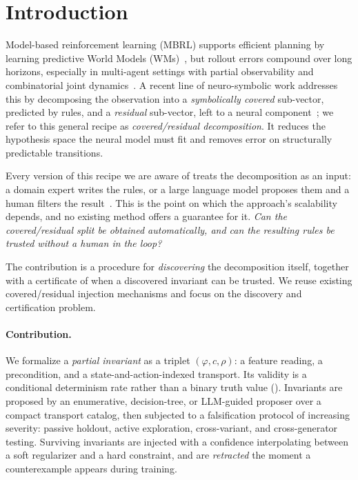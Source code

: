 \documentclass[letterpaper]{article} %
\let\autoref\Cref
\theoremstyle{plain}
\theoremstyle{definition}
\theoremstyle{remark}
\begin{document}
\section{Introduction}
\label{sec:intro}

Model-based reinforcement learning (MBRL) supports efficient planning by learning predictive World Models (WMs)~\cite{hafner2018planet,hafner2019dreamer,janner2019mbpo,schrittwieser2020muzero}, but rollout errors compound over long horizons, especially in multi-agent settings with partial observability and combinatorial joint dynamics~\cite{willemsen2021mambpo}. A recent line of neuro-symbolic work addresses this by decomposing the observation into a \emph{symbolically covered} sub-vector, predicted by rules, and a \emph{residual} sub-vector, left to a neural component~\cite{balloch2023neurosymbolicworldmodelsadapting,zhu2022iaem}; we refer to this general recipe as \emph{covered/residual decomposition}. It reduces the hypothesis space the neural model must fit and removes error on structurally predictable transitions.

Every version of this recipe we are aware of treats the decomposition as an input: a domain expert writes the rules, or a large language model proposes them and a human filters the result~\cite{zhou2024walle,athalye2026pixelstopredicates}. This is the point on which the approach's scalability depends, and no existing method offers a guarantee for it. \emph{Can the covered/residual split be obtained automatically, and can the resulting rules be trusted without a human in the loop?}

The contribution is a procedure for \emph{discovering} the decomposition itself, together with a certificate of when a discovered invariant can be trusted. We reuse existing covered/residual injection mechanisms and focus on the discovery and certification problem.

\paragraph{Contribution.} We formalize a \emph{partial invariant} as a triplet $(\varphi, c, \rho)$: a feature reading, a precondition, and a state-and-action-indexed transport. Its validity is a conditional determinism rate rather than a binary truth value (\autoref{sec:invariants}). Invariants are proposed by an enumerative, decision-tree, or LLM-guided proposer over a compact transport catalog, then subjected to a falsification protocol of increasing severity: passive holdout, active exploration, cross-variant, and cross-generator testing. Surviving invariants are injected with a confidence interpolating between a soft regularizer and a hard constraint, and are \emph{retracted} the moment a counterexample appears during training.
\end{document}
